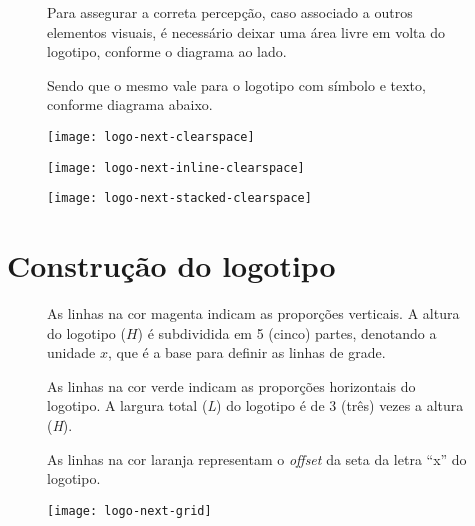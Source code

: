 \documentclass{manualmarca}
\begin{document}
\begin{figure}[!htp]
  \centering
  \begin{minipage}{.32\textwidth}
    Para assegurar a correta percepção, caso associado a outros elementos visuais, é necessário deixar uma área livre em volta do logotipo, conforme o diagrama ao lado.

    Sendo que o mesmo vale para o logotipo com símbolo e texto, conforme diagrama abaixo.
  \end{minipage}%
  \hfill
  \begin{minipage}{.65\textwidth}
  \centering
  \texttt{[image: logo-next-clearspace]}
\end{minipage}
\end{figure}

\begin{figure}[!htp]
  \centering
  \texttt{[image: logo-next-inline-clearspace]}
\end{figure}

\begin{figure}[!htp]
  \centering
  \texttt{[image: logo-next-stacked-clearspace]}
\end{figure}

\pagebreak[4]
\section{Construção do logotipo}
\label{sec:const-logotipo}

\begin{figure}[!htp]
  \centering
  \begin{minipage}{.32\textwidth}
    As linhas na cor {\color[named]{magenta} magenta} indicam as proporções verticais. A altura do logotipo (\emph{$H$}) é subdividida em 5 (cinco) partes, denotando a unidade $x$, que é a base para definir as linhas de grade.
    
    As linhas na cor {\color{black!30!green} verde} indicam as proporções horizontais do logotipo. A largura total (\emph{L}) do logotipo é de 3 (três) vezes a altura (\emph{H}).

    As linhas na cor {\color{orange} laranja} representam o \emph{offset} da seta da letra ``x'' do logotipo.
  \end{minipage}%
  \hfill
  \begin{minipage}{.65\textwidth}
  \centering
  \texttt{[image: logo-next-grid]}
\end{minipage}
\end{figure}
\end{document}

